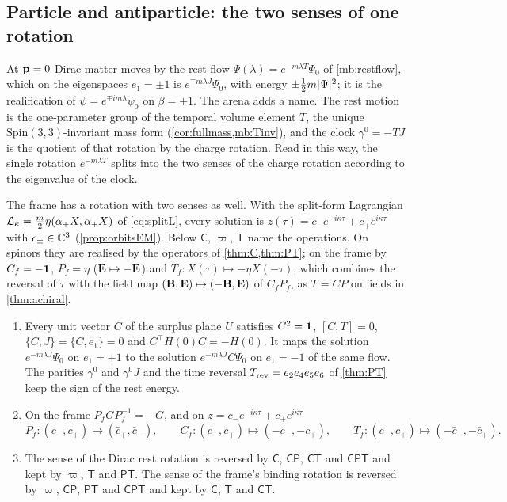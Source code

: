 \subsection{Particle and antiparticle: the two senses of one rotation}
\label{sec:masssenses}

At $\mathbf p=0$ Dirac matter moves by the rest flow $\Psi(\lambda)=e^{-m\lambda T}\Psi_0$ of \cref{mb:restflow}, which on the eigenspaces $e_1=\pm1$ is $e^{\mp m\lambda J}\Psi_0$, with energy $\pm\tfrac12 m|\Psi|^2$; it is the realification of $\psi=e^{\mp im\lambda}\psi_0$ on $\beta=\pm1$. The arena adds a name. The rest motion is the one-parameter group of the temporal volume element $T$, the unique
$\mathrm{Spin}(3,3)$-invariant mass form (\cref{cor:fullmass,mb:Tinv}), and the clock $\gamma^0=-TJ$ is the quotient of that rotation by the charge
rotation. Read in this way, the single rotation $e^{-m\lambda T}$ splits into the two senses of the charge rotation according to the
eigenvalue of the clock.

The frame has a rotation with two senses as well. With the split-form Lagrangian $\mathcal L_\kappa=\tfrac m2\eta(\alpha_+X,\alpha_+X)$ of
\eqref{eq:splitL}, every solution is $z(\tau)=c_-e^{-i\kappa\tau}+c_+e^{i\kappa\tau}$ with $c_\pm\in\mathbb{C}^3$ (\cref{prop:orbitsEM}). Below
$\mathsf C$, $\varpi$, $\mathsf T$ name the operations. On spinors they are realised by the operators of \cref{thm:C,thm:PT}; on the frame
by $C_f=-\mathbf 1$, $P_f=\eta$ ($\mathbf E\mapsto-\mathbf E$) and $T_f\colon X(\tau)\mapsto-\eta X(-\tau)$, which combines the reversal of $\tau$ with the field
map $(\mathbf B,\mathbf E)\mapsto(-\mathbf B,\mathbf E)$ of $C_fP_f$, as $T=CP$ on fields in \cref{thm:achiral}.

\begin{proposition}
\label{mb:senses}
\begin{enumerate}[label=(\roman*),leftmargin=2.2em]
\item Every unit vector $C$ of the surplus plane $U$ satisfies $C^2=\mathbf 1$, $[C,T]=0$, $\{C,J\}=\{C,e_1\}=0$ and $C^{\!\top}H(0)C=-H(0)$. It maps the
solution $e^{-m\lambda J}\Psi_0$ on $e_1=+1$ to the solution $e^{+m\lambda J}C\Psi_0$ on $e_1=-1$ of the same flow. The parities $\gamma^0$ and
$\gamma^0J$ and the time reversal $T_{\rm rev}=e_2e_4e_5e_6$ of \cref{thm:PT} keep the sign of the rest energy.
\item On the frame $P_fGP_f^{-1}=-G$, and on $z=c_-e^{-i\kappa\tau}+c_+e^{i\kappa\tau}$
\[
P_f\colon(c_-,c_+)\mapsto(\bar c_+,\bar c_-),\qquad C_f\colon(c_-,c_+)\mapsto(-c_-,-c_+),\qquad T_f\colon(c_-,c_+)\mapsto(-\bar c_-,-\bar c_+).
\]
\item The sense of the Dirac rest rotation is reversed by $\mathsf C$, $\mathsf{CP}$, $\mathsf{CT}$ and $\mathsf{CPT}$ and kept by $\varpi$,
$\mathsf T$ and $\mathsf{PT}$. The sense of the frame's binding rotation is reversed by $\varpi$, $\mathsf{CP}$, $\mathsf{PT}$ and $\mathsf{CPT}$
and kept by $\mathsf C$, $\mathsf T$ and $\mathsf{CT}$.
\end{enumerate}
\end{proposition}

